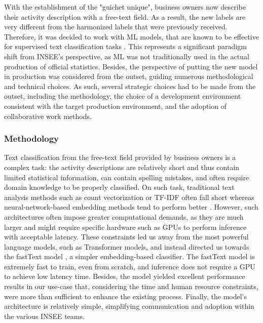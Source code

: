 \documentclass[graybox]{svmult}
\begin{document}
With the establishment of the "guichet unique", business owners now describe their activity description with a free-text field. As a result, the new labels are very different from the harmonized labels that were previously received. Therefore, it was decided to work with ML models, that are known to be effective for supervised text classification tasks \citep{li2022survey}. This represents a significant paradigm shift from INSEE's perspective, as ML was not traditionally used in the actual production of official statistics. Besides, the perspective of putting the new model in production was considered from the outset, guiding numerous methodological and technical choices. As such, several strategic choices had to be made from the outset, including the methodology, the choice of a development environment consistent with the target production environment, and the adoption of collaborative work methods.

\subsubsection{Methodology}

Text classification from the free-text field provided by business owners is a complex task: the activity descriptions are relatively short and thus contain limited statistical information, can contain spelling mistakes, and often require domain knowledge to be properly classified. On such task, traditional text analysis methods such as count vectorization or TF-IDF often fall short whereas neural-network-based embedding methods tend to perform better \citep{li2022survey}. However, such architectures often impose greater computational demands, as they are much larger and might require specific hardware such as GPUs to perform inference with acceptable latency. These constraints led us away from the most powerful language models, such as Transformer models, and instead directed us towards the fastText model \citep{joulin2016bag}, a simpler embedding-based classifier. The fastText model is extremely fast to train, even from scratch, and inference does not require a GPU to achieve low latency time. Besides, the model yielded excellent performance results in our use-case that, considering the time and human resource constraints, were more than sufficient to enhance the existing process. Finally, the model's architecture is relatively simple, simplifying communication and adoption within the various INSEE teams.
\end{document}
